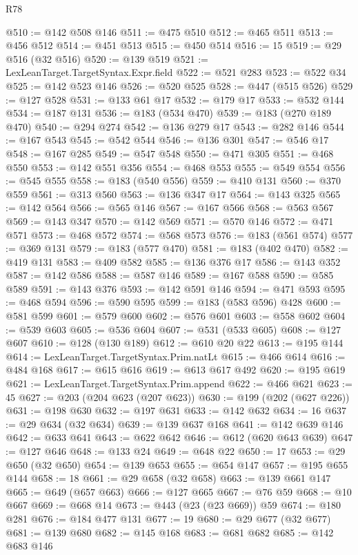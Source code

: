 \begin{lexlean}{R78}
\begin{coremodule}
@510 := @142 @508 @146
@511 := @475 @510
@512 := @465 @511
@513 := @456 @512
@514 := @451 @513
@515 := @450 @514
@516 := 15
@519 := @29 @516 (@32 @516)
@520 := @139 @519
@521 := LexLeanTarget.TargetSyntax.Expr.field
@522 := @521 @283
@523 := @522 @34
@525 := @142 @523 @146
@526 := @520 @525
@528 := @447 (@515 @526)
@529 := @127 @528
@531 := @133 @61 @17
@532 := @179 @17
@533 := @532 @144
@534 := @187 @131
@536 := @183 (@534 @470)
@539 := @183 (@270 @189 @470)
@540 := @294 @274
@542 := @136 @279 @17
@543 := @282 @146
@544 := @167 @543
@545 := @542 @544
@546 := @136 @301
@547 := @546 @17
@548 := @167 @285
@549 := @547 @548
@550 := @471 @305
@551 := @468 @550
@553 := @142 @551 @356
@554 := @468 @553
@555 := @549 @554
@556 := @545 @555
@558 := @183 (@540 @556)
@559 := @410 @131
@560 := @370 @559
@561 := @313 @560
@563 := @136 @347 @17
@564 := @143 @325
@565 := @142 @564
@566 := @565 @146
@567 := @167 @566
@568 := @563 @567
@569 := @143 @347
@570 := @142 @569
@571 := @570 @146
@572 := @471 @571
@573 := @468 @572
@574 := @568 @573
@576 := @183 (@561 @574)
@577 := @369 @131
@579 := @183 (@577 @470)
@581 := @183 (@402 @470)
@582 := @419 @131
@583 := @409 @582
@585 := @136 @376 @17
@586 := @143 @352
@587 := @142 @586
@588 := @587 @146
@589 := @167 @588
@590 := @585 @589
@591 := @143 @376
@593 := @142 @591 @146
@594 := @471 @593
@595 := @468 @594
@596 := @590 @595
@599 := @183 (@583 @596) @428
@600 := @581 @599
@601 := @579 @600
@602 := @576 @601
@603 := @558 @602
@604 := @539 @603
@605 := @536 @604
@607 := @531 (@533 @605)
@608 := @127 @607
@610 := @128 (@130 @189)
@612 := @610 @20 @22
@613 := @195 @144
@614 := LexLeanTarget.TargetSyntax.Prim.natLt
@615 := @466 @614
@616 := @484 @168
@617 := @615 @616
@619 := @613 @617 @492
@620 := @195 @619
@621 := LexLeanTarget.TargetSyntax.Prim.append
@622 := @466 @621
@623 := 45
@627 := @203 (@204 @623 (@207 @623))
@630 := @199 (@202 (@627 @226))
@631 := @198 @630
@632 := @197 @631
@633 := @142 @632
@634 := 16
@637 := @29 @634 (@32 @634)
@639 := @139 @637 @168
@641 := @142 @639 @146
@642 := @633 @641
@643 := @622 @642
@646 := @612 (@620 @643 @639)
@647 := @127 @646
@648 := @133 @24
@649 := @648 @22
@650 := 17
@653 := @29 @650 (@32 @650)
@654 := @139 @653
@655 := @654 @147
@657 := @195 @655 @144
@658 := 18
@661 := @29 @658 (@32 @658)
@663 := @139 @661 @147
@665 := @649 (@657 @663)
@666 := @127 @665
@667 := @76 @59
@668 := @10 @667
@669 := @668 @14
@673 := @443 (@23 (@23 @669)) @59
@674 := @180 @281
@676 := @184 @477 @131
@677 := 19
@680 := @29 @677 (@32 @677)
@681 := @139 @680
@682 := @145 @168
@683 := @681 @682
@685 := @142 @683 @146

\end{coremodule}
\end{lexlean}

